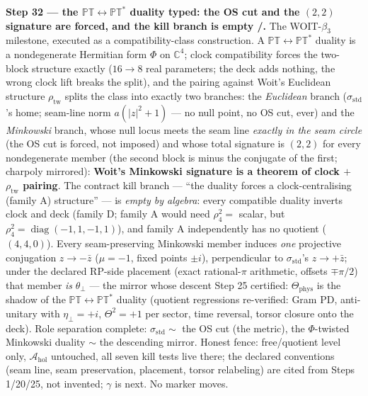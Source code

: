 \par\smallskip\noindent\textbf{Step 32 --- the $\mathbb{PT}\leftrightarrow\mathbb{PT}^*$
duality typed: the OS cut and the $(2,2)$ signature are forced, and the kill branch is empty
\mE/\mC.} The WOIT-$\beta_3$ milestone, executed as a compatibility-class construction.  A
$\mathbb{PT}\leftrightarrow\mathbb{PT}^*$ duality is a nondegenerate Hermitian form $\Phi$ on
$\mathbb{C}^4$; clock compatibility forces the two-block structure exactly ($16\to8$ real parameters;
the deck adds nothing, the wrong clock lift breaks the split), and the pairing against Woit's
Euclidean structure $\rho_{\mathrm{tw}}$ splits the class into exactly two branches: the
\emph{Euclidean} branch ($\sigma_{\mathrm{std}}$'s home; seam-line norm $a(|z|^2+1)$ --- no
null point, no OS cut, ever) and the \emph{Minkowski} branch, whose null locus meets the seam
line \emph{exactly in the seam circle} (the OS cut is forced, not imposed) and whose total
signature is $(2,2)$ for every nondegenerate member (the second block is minus the conjugate
of the first; charpoly mirrored): \textbf{Woit's Minkowski signature is a theorem of clock
$+$ $\rho_{\mathrm{tw}}$ pairing}.  The contract kill branch --- ``the duality forces a
clock-centralising (family A) structure'' --- is \emph{empty by algebra}: every compatible
duality inverts clock and deck (family D; family A would need $\rho_4^2=$ scalar, but
$\rho_4^2=\operatorname{diag}(-1,1,-1,1)$), and family A independently has no quotient
($(4,4,0)$).  Every seam-preserving Minkowski member induces \emph{one} projective
conjugation $z\to-\bar z$ ($\mu=-1$, fixed points $\pm i$), perpendicular to
$\sigma_{\mathrm{std}}$'s $z\to+\bar z$; under the declared RP-side placement (exact
rational-$\pi$ arithmetic, offsets $\mp\pi/2$) that member \emph{is} $\theta_\perp$ --- the
mirror whose descent Step 25 certified: $\Theta_{\mathrm{phys}}$ is the shadow of the
$\mathbb{PT}\leftrightarrow\mathbb{PT}^*$ duality (quotient regressions re-verified: Gram PD,
anti-unitary with $\eta_\perp=+i$, $\Theta^2=+1$ per sector, time reversal, torsor closure
onto the deck).  Role separation complete: $\sigma_{\mathrm{std}}\sim$ the OS cut (the
metric), the $\Phi$-twisted Minkowski duality $\sim$ the descending mirror.  Honest fence:
free/quotient level only, $\mathcal A_{\mathrm{hol}}$ untouched, all seven kill tests live
there; the declared conventions (seam line, seam preservation, placement, torsor relabeling)
are cited from Steps 1/20/25, not invented; $\gamma$ is next.  No marker moves.

